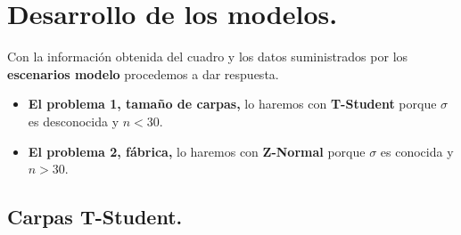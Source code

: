\documentclass[a4paper,12pt]{article} %
\begin{document}
\section{Desarrollo de los modelos.}
\vspace{\baselineskip}


\begin{table}[H]
\centering
{}
\end{table}

\begin{justify}
    Con la información obtenida del cuadro y los datos suministrados por los \textbf{escenarios modelo} procedemos a dar respuesta.
\end{justify}

\begin{itemize}
    \item \textbf{El problema 1, tamaño de carpas,} lo haremos con \textbf{T-Student} porque \(\sigma\) es desconocida y \(n < 30 \).
    \item \textbf{El problema 2, fábrica,} lo haremos con \textbf{Z-Normal} porque \(\sigma\) es conocida y \(n > 30\).
\end{itemize}

\subsection{Carpas  T-Student.}
\end{document}
